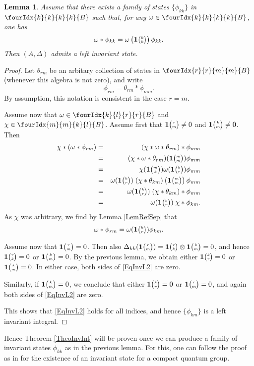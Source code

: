 \documentclass[11pt]{article}
\newcommand{\Grt}[3]{#1{\tiny {\begin{pmatrix} #2\\#3\end{pmatrix}}}}
\newcommand{\UnitC}[2]{\Grt{\mathbf{1}}{#1}{#2}}
\newcommand{\Gr}[5]{\fourIdx{#2}{#4}{#3}{#5}{#1}}%
\newtheorem{Lem}[Theorem]{Lemma}
\theoremstyle{definition}
\numberwithin{equation}{section}
\begin{document}
\begin{Lem} Assume that there exists a family of states $\{\phi_{kk}\}$ in $\Gr{B}{k}{k}{k}{k}$ such that, for any $\omega \in \Gr{B}{k}{k}{k}{k}$, one has \[\omega*\phi_{kk} = \omega\left(\UnitC{k}{k}\right)\phi_{kk}.\] Then $(A,\Delta)$ admits a left invariant state.
\end{Lem}
\begin{proof} Let $\theta_{rm}$ be an arbitary collection of states in $\Gr{B}{r}{m}{r}{m}$ (whenever this algebra is not zero), and write \[\phi_{rm} = \theta_{rm}*\phi_{mm}.\] By assumption, this notation is consistent in the case $r=m$. 

Assume now that $\omega \in \Gr{B}{k}{r}{l}{r}$ and $\chi \in \Gr{B}{m}{k}{m}{l}$. Assume first that $\UnitC{r}{m}\neq 0$ and $\UnitC{k}{m}\neq 0$. Then \begin{eqnarray*} \chi*(\omega*\phi_{rm}) &=& (\chi*\omega*\theta_{rm})*\phi_{mm} \\ &=&  (\chi*\omega*\theta_{rm})(\UnitC{m}{m}) \phi_{mm} \\ &=&  \chi(\UnitC{m}{k})\omega(\UnitC{k}{r})\phi_{mm} \\ &=&  \omega(\UnitC{k}{r}) \; (\chi*\theta_{km})\left(\UnitC{m}{m}\right)\phi_{mm}
\\ &=& \omega(\UnitC{k}{r}) \; (\chi*\theta_{km})*\phi_{mm} \\ &=&  \omega(\UnitC{k}{r}) \; \chi*\phi_{km} .\end{eqnarray*} As $\chi$ was arbitrary, we find by Lemma \ref{LemRefSep} that \begin{equation}\label{EqInvL2} \omega*\phi_{rm} =  \omega(\UnitC{k}{r}) \phi_{km}.\end{equation}

Assume now that $\UnitC{r}{m}=0$. Then also $\Delta_{kk}(\UnitC{r}{m}) = \UnitC{r}{k}\otimes \UnitC{k}{m}=0$, and hence $\UnitC{r}{k}=0$ or $\UnitC{k}{m}=0$. By the previous lemma, we obtain either $\UnitC{k}{r}=0$ or $\UnitC{k}{m}=0$. In either case, both sides of \eqref{EqInvL2} are zero. 

Similarly, if $\UnitC{k}{m}=0$, we conclude that either $\UnitC{k}{r}=0$ or $\UnitC{r}{m}=0$, and again both sides of \eqref{EqInvL2} are zero.

This shows that \eqref{EqInvL2} holds for all indices, and hence $\{\phi_{km}\}$ is a left invariant integral. 
\end{proof} 

Hence Theorem \ref{TheoInvInt} will be proven once we can produce a family of invariant states $\phi_{kk}$ as in the previous lemma. For this, one can follow the proof as in \cite{MVD1} for the existence of an invariant state for a compact quantum group.
\end{document}
